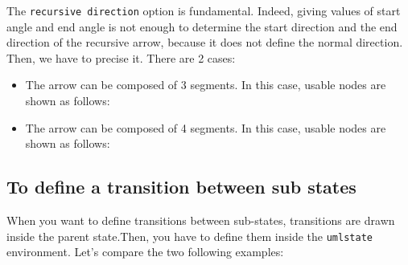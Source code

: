 \documentclass[a4paper,11pt]{report}
\begin{document}
\medskip

The {\tt recursive direction} option is fundamental. Indeed, giving values of start angle and end angle is not enough to determine the start direction and the end direction of the recursive arrow, because it does not define the normal direction. Then, we have to precise it. There are 2 cases:

\medskip

\begin{itemize}
\item The arrow can be composed of 3 segments. In this case, usable nodes are shown as follows:
\vspace{-0.5cm}
\begin{center}
\end{center}
\vspace{-0.5cm}

\item The arrow can be composed of 4 segments. In this case, usable nodes are shown as follows:
\vspace{-0.1cm}
\begin{center}
\end{center}
\vspace{-4cm}

\end{itemize}

\subsection{To define a transition between sub states}\label{ss.substatetrans}

When you want to define transitions between sub-states, transitions are drawn inside the parent state.Then, you have to define them inside the {\tt umlstate} environment. Let's compare the two following examples:

\medskip

\begin{minipage}{0.51\textwidth}

\end{minipage}
\begin{minipage}{0.49\textwidth}
\begin{center}
\end{center}
\end{minipage}

\begin{minipage}{0.51\textwidth}

\end{minipage}
\begin{minipage}{0.49\textwidth}
\begin{center}
\end{center}
\end{minipage}
\end{document}
